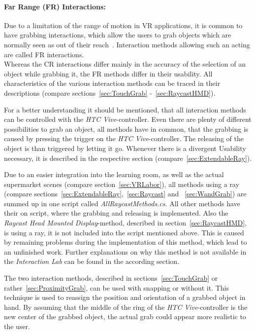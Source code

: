 \paragraph{Far Range (FR) Interactions:} Due to a limitation of the range of motion in VR applications, it is common to have grabbing interactions, which allow the users to grab objects which are normally seen as out of their reach~\cite{VRBook}. Interaction methods allowing such an acting are called FR interactions. \\

Whereas the CR interactions differ mainly in the accuracy of the selection of an object while grabbing it, the FR methods differ in their usability. All characteristics of the various interaction methods can be traced in their descriptions (compare sections~\ref{sec:TouchGrab} -~\ref{sec:RaycastHMD}).

For a better understanding it should be mentioned, that all interaction methods can be controlled with the \textit{HTC Vive}-controller. Even there are plenty of different possibilities to grab an object, all methods have in common, that the grabbing is caused by pressing the trigger on the \textit{HTC Vive}-controller. The releasing of the object is than triggered by letting it go. Whenever there is a divergent Usability necessary, it is described in the respective section (compare~\ref{sec:ExtendableRay}).

Due to an easier integration into the learning room, as well as the actual supermarket scenes (compare section~\ref{sec:VRLabor}), all methods using a ray (compare sections~\ref{sec:ExtendableRay},~\ref{sec:Raycast} and ~\ref{sec:WandGrab}) are summed up in one script called \textit{AllRaycastMethods.cs}. All other methods have their on script, where the grabbing and releasing is implemented. Also the \textit{Raycast Head Mounted Display}-method, described in section~\ref{sec:RaycastHMD}, is using a ray, it is not included into the script mentioned above. This is caused by remaining problems during the implementation of this method, which lead to an unfinished work. Further explanations on why this method is not available in the \textit{Interaction Lab} can be found in the according section.

The two interaction methods, described in sections~\ref{sec:TouchGrab} or rather~\ref{sec:ProximityGrab}, can be used with snapping or without it. This technique is used to reassign the position and orientation of a grabbed object in hand. By assuming that the middle of the ring of the \textit{HTC Vive}-controller is the new center of the grabbed object, the actual grab could appear more realistic to the user. 

